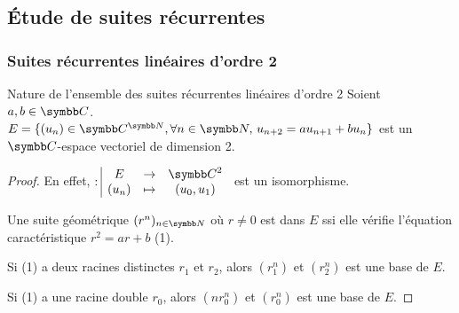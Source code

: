 \subsection{Étude de suites récurrentes}
\subsubsection{Suites récurrentes linéaires d'ordre 2}
\begin{proposition}{Nature de l'ensemble des suites récurrentes linéaires d'ordre 2}{}
    Soient $a, b \in \C$.  
    $E = \{(u_n) \in \C^{\N}, \forall n \in \N, \, u_{n + 2} = a u_{n + 1} + bu_n\}$ est 
    un $\C$-espace vectoriel de dimension 2. 
\end{proposition}
\newpage

\begin{proof}
    En effet, $\fonction{}{E}{\C^2}{(u_n)}{(u_0, u_1)}$ est un isomorphisme. 
    
    Une suite géométrique $(r^n)_{n \in \N}$ où $r \neq 0$ est dans $E$ ssi elle vérifie
    l'équation caractéristique $r^2 = ar + b$ (1).

    Si (1) a deux racines distinctes $r_1$ et $r_2$, alors $(r_1^n)$ et $(r_2^n)$ est une base de $E$.

    Si (1) a une racine double $r_0$, alors $(nr_0^n)$ et $(r_0^n)$ est une base de $E$.    
\end{proof}

